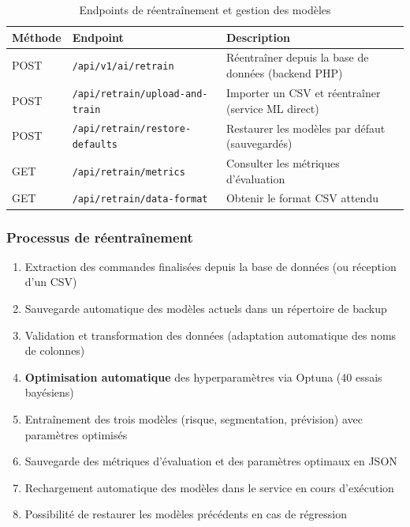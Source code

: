 \documentclass[12pt,a4paper]{report}
\begin{document}
\begin{table}[H]
\centering
\caption{Endpoints de r\'{e}entra\^{i}nement et gestion des mod\`{e}les}
\label{tab:retrain_endpoints}
\begin{tabularx}{\textwidth}{l l X}
\toprule
\textbf{M\'{e}thode} & \textbf{Endpoint} & \textbf{Description} \\
\midrule
POST & \texttt{/api/v1/ai/retrain} & R\'{e}entra\^{i}ner depuis la base de donn\'{e}es (backend PHP) \\
POST & \texttt{/api/retrain/upload-and-train} & Importer un CSV et r\'{e}entra\^{i}ner (service ML direct) \\
POST & \texttt{/api/retrain/restore-defaults} & Restaurer les mod\`{e}les par d\'{e}faut (sauvegard\'{e}s) \\
GET & \texttt{/api/retrain/metrics} & Consulter les m\'{e}triques d'\'{e}valuation \\
GET & \texttt{/api/retrain/data-format} & Obtenir le format CSV attendu \\
\bottomrule
\end{tabularx}
\end{table}

\subsubsection{Processus de r\'{e}entra\^{i}nement}

\begin{enumerate}
  \item Extraction des commandes finalis\'{e}es depuis la base de donn\'{e}es (ou r\'{e}ception d'un CSV)
  \item Sauvegarde automatique des mod\`{e}les actuels dans un r\'{e}pertoire de backup
  \item Validation et transformation des donn\'{e}es (adaptation automatique des noms de colonnes)
  \item \textbf{Optimisation automatique} des hyperparam\`{e}tres via Optuna (40 essais bay\'{e}siens)
  \item Entra\^{i}nement des trois mod\`{e}les (risque, segmentation, pr\'{e}vision) avec param\`{e}tres optimis\'{e}s
  \item Sauvegarde des m\'{e}triques d'\'{e}valuation et des param\`{e}tres optimaux en JSON
  \item Rechargement automatique des mod\`{e}les dans le service en cours d'ex\'{e}cution
  \item Possibilit\'{e} de restaurer les mod\`{e}les pr\'{e}c\'{e}dents en cas de r\'{e}gression
\end{enumerate}
\end{document}
